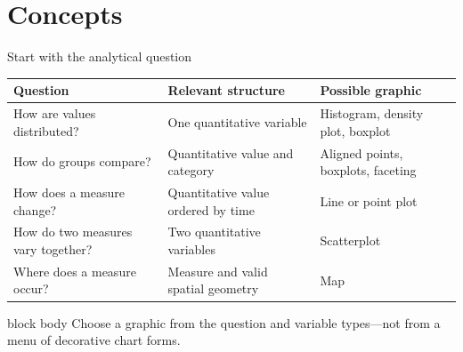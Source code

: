 \documentclass[10pt,aspectratio=169]{beamer}
\begin{document}
\section{Concepts}


\begin{frame}{Start with the analytical question}

\scriptsize

\begin{tabularx}{\textwidth}{lXX}
\toprule
\textbf{Question} & \textbf{Relevant structure} & \textbf{Possible graphic} \\
\midrule
How are values distributed? & One quantitative variable & Histogram, density plot, boxplot \\
How do groups compare? & Quantitative value and category & Aligned points, boxplots, faceting \\
How does a measure change? & Quantitative value ordered by time & Line or point plot \\
How do two measures vary together? & Two quantitative variables & Scatterplot \\
Where does a measure occur? & Measure and valid spatial geometry & Map \\
\bottomrule
\end{tabularx}

\vspace{0.40cm}

\small

\begin{beamercolorbox}[rounded=true,sep=8pt]{block body}
Choose a graphic from the question and variable types---not from a menu of decorative chart forms.
\end{beamercolorbox}

\end{frame}
\end{document}
